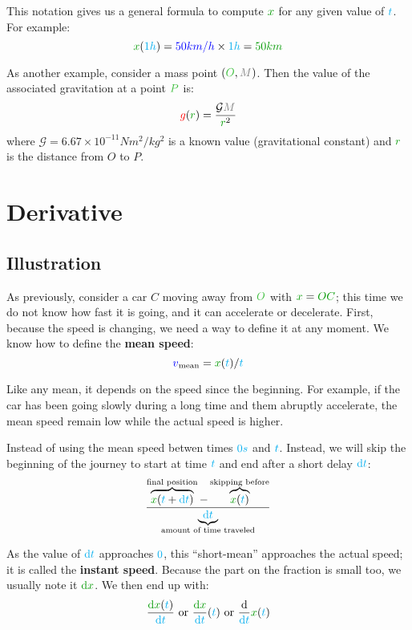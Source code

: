 This notation gives us a general formula to compute $\dist{x}$ for any
given value of $\textcolor{cyan}{t}$. For example:
\[
\dist{x}(\delay{1h})
= \speed{50km/h} \times \delay{1h}
= \dist{50 km}
\]

As another example, consider a mass point $(\posit{O}, \mass{M})$. Then
the value of the associated gravitation at a point $\posit{P}$ is:
\[
\accel{g}(\dist{r}) = \frac {\mathcal G \mass{M}} {\dist{r}^2}
\]
where $\mathcal G = 6.67 \times 10^{-11} N m^2/kg^2$ is a known value
(gravitational constant) and $\dist{r}$ is the distance from $O$ to $P$.

\section{Derivative}

\subsection{Illustration}

As previously, consider a car $C$ moving away from $\posit{O}$ with
$\dist{x} = \dist{OC}$; this time we do not know how fast it is going, and
it can accelerate or decelerate. First, because the speed is changing,
we need a way to define it at any moment. We know how to define the
\textbf{mean speed}:
\[
\speed{v}_{\mathrm{mean}} = \dist{x}(\delay{t}) / \delay{t}
\]

Like any mean, it depends on the speed since the beginning. For example,
if the car has been going slowly during a long time and them abruptly
accelerate, the mean speed remain low while the actual speed is higher.

Instead of using the mean speed betwen times $\textcolor{cyan}{0s}$ and
$\textcolor{cyan}{t}$. Instead, we will skip the beginning of the journey to start
at time $\textcolor{cyan}{t}$ and end after a short delay $\textcolor{cyan}{\mathrm{d} t}$:
\[
\frac {
	\overbrace{\dist{x}(\delay{t}+\delay{\dt})}^{\text{final position}}
	- \overbrace{\dist{x}(\delay{t})}^{\text{skipping before}}
} {\underbrace{\delay{\dt}}_{\text{amount of time traveled}}}
\]

As the value of $\textcolor{cyan}{\mathrm{d} t}$ approaches $\textcolor{cyan}{0}$, this
“short-mean” approaches the actual speed; it is called the
\textbf{instant speed}. Because the part on the fraction is small too,
we usually note it $\dist{\d x}$. We then end up with:
\[
\frac {\dist{\d x}(\delay{t})} {\delay{\dt}}
\text{ or }
\frac {\dist{\d x}} {\delay{\dt}}(\delay{t})
\text{ or }
\frac {\d} {\delay{\dt}} \dist{x}(\delay{t})
\]

